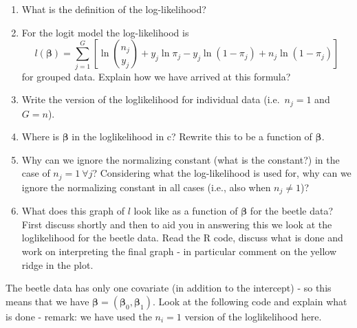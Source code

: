 \documentclass[
]{article}
\begin{document}
\begin{enumerate}
\def\labelenumi{\alph{enumi})}
\item
  What is the definition of the log-likelihood?
\item
  For the logit model the log-likelihood is
  \[l(\boldsymbol{\beta})=\sum_{j=1}^G[\ln \binom{n_j}{y_j}+ y_j \ln \pi_j-y_j\ln(1-\pi_j)+n_j\ln(1-\pi_j)]\]
  for grouped data. Explain how we have arrived at this formula?
\item
  Write the version of the loglikelihood for individual data
  (i.e.~\(n_j=1\) and \(G=n\)).
\item
  Where is \(\boldsymbol{\beta}\) in the loglikelihood in c? Rewrite
  this to be a function of \(\boldsymbol{\beta}\).
\item
  Why can we ignore the normalizing constant (what is the constant?) in
  the case of \(n_j = 1 \ \forall j\)? Considering what the
  log-likelihood is used for, why can we ignore the normalizing constant
  in all cases (i.e., also when \(n_j \neq 1\))?
\item
  What does this graph of \(l\) look like as a function of
  \(\boldsymbol{\beta}\) for the beetle data? First discuss shortly and
  then to aid you in answering this we look at the loglikelihood for the
  beetle data. Read the R code, discuss what is done and work on
  interpreting the final graph - in particular comment on the yellow
  ridge in the plot.
\end{enumerate}

The beetle data has only one covariate (in addition to the intercept) -
so this means that we have
\(\boldsymbol{\beta}=(\boldsymbol{\beta}_0,\boldsymbol{\beta}_1)\). Look
at the following code and explain what is done - remark: we have used
the \(n_i=1\) version of the loglikelihood here.
\end{document}
